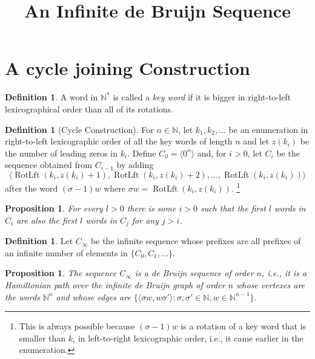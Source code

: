 \documentclass{article}
\title{An Infinite de Bruijn Sequence}
\author{}
\newtheorem{proposition}[theorem]{Proposition}
\theoremstyle{definition}
\newtheorem{definition}[theorem]{Definition}
\DeclareMathOperator{\RotateLeft}{RotLft}
\newcommand{\N}{{\mathbb{N}}}
\newcommand{\T}[1]{\langle{#1}\rangle}
\begin{document}
\maketitle




\section{A cycle joining Construction}


\begin{definition}
	A word in $\N^*$ is called a \emph{key word} if it is bigger in right-to-left lexicographical order than all of its rotations.
\end{definition}

\begin{definition}[Cycle Construction]
For $n\in \N$, let $k_1,k_2,\dots$ be an enumeration in right-to-left lexicographic order of all the key words of length $n$ and let $z(k_i)$ be the number of leading zeros in $k_i$. Define $C_0=\T{0^n}$ and, for $i>0$, let $C_i$ be the sequence obtained from $C_{i-1}$ by adding 
	$$\T{\RotateLeft(k_i,z(k_i)+1),\RotateLeft(k_i,z(k_i)+2),\dots,\RotateLeft(k_i,z(k_i))}$$ 
after the word $(\sigma-1)w$ where $\sigma w=\RotateLeft(k_i,z(k_i))$. \footnote{This is always possible because  $(\sigma-1)w$ is a rotation of a key word that is smaller than $k_i$ in left-to-right lexicographic order, i.e., it came earlier in the enumeration.}  
\end{definition}


\begin{proposition}
For every $l>0$ there is some $i>0$ such that the first $l$ words in $C_i$ are also the first $l$ words in $C_j$ for any $j>i$.
\end{proposition}

\begin{definition}
Let $C_\infty$ be the infinite sequence whose prefixes are all prefixes of an infinite number of elements in $\{C_0,C_1,\dots\}$.
\end{definition}

\begin{proposition}
The sequence $C_\infty$ is a de Bruijn sequence of order $n$, i.e., it is a Hamiltonian path over the infinite de Bruijn graph of order $n$ whose vertexes are the words $\N^n$ and whose edges are $\{ \T{ \sigma w, w \sigma'} \colon \sigma, \sigma' \in \N, w \in \N^{n-1} \}$.
\end{proposition}
\end{document}
